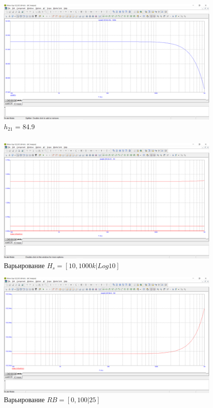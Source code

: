 \documentclass[a4paper, 12pt]{article}%
\begin{document}
\subsubsection{}
\FloatBarrier
\begin{figure}
    \centering
    \includegraphics[scale = 0.4 \textwidth]{images/mod5_1_1.png}
    \caption{$h_{21}$ = 84.9}
    \label{fig:m511}
\end{figure}
\FloatBarrier
\subsubsection{}
\FloatBarrier
\begin{figure}[h!]
    \centering
    \includegraphics[scale = 0.4 \textwidth]{images/mod5_1_2_1.png}
    \caption{Варьирование $H_s = [10, 1000k|Log10]$}
    \label{fig:m5121}
\end{figure}

\begin{figure}[h!]
    \centering
    \includegraphics[scale = 0.4 \textwidth]{images/mod5_1_2_2.png}
    \caption{Варьирование $RB = [0, 100|25]$}
    \label{fig:m5122}
\end{figure}
\FloatBarrier
\end{document}
